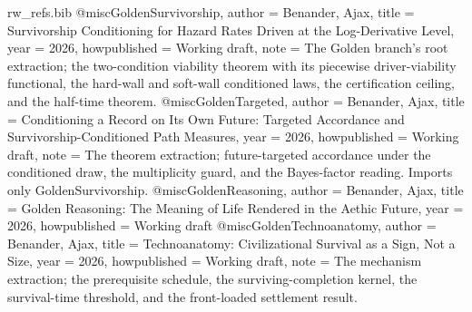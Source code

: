\begin{filecontents}[overwrite]{rw_refs.bib}
@misc{GoldenSurvivorship,
  author       = {Benander, Ajax},
  title        = {Survivorship Conditioning for Hazard Rates Driven at the Log-Derivative Level},
  year         = {2026},
  howpublished = {Working draft},
  note         = {The Golden branch's root extraction; the two-condition viability
                  theorem with its piecewise driver-viability functional, the
                  hard-wall and soft-wall conditioned laws, the certification
                  ceiling, and the half-time theorem.}
}
@misc{GoldenTargeted,
  author       = {Benander, Ajax},
  title        = {Conditioning a Record on Its Own Future: Targeted Accordance and Survivorship-Conditioned Path Measures},
  year         = {2026},
  howpublished = {Working draft},
  note         = {The theorem extraction; future-targeted accordance under the
                  conditioned draw, the multiplicity guard, and the Bayes-factor
                  reading. Imports only GoldenSurvivorship.}
}
@misc{GoldenReasoning,
  author       = {Benander, Ajax},
  title        = {Golden Reasoning: The Meaning of Life Rendered in the Aethic Future},
  year         = {2026},
  howpublished = {Working draft}
}
@misc{GoldenTechnoanatomy,
  author       = {Benander, Ajax},
  title        = {Technoanatomy: Civilizational Survival as a Sign, Not a Size},
  year         = {2026},
  howpublished = {Working draft},
  note         = {The mechanism extraction; the prerequisite schedule, the
                  surviving-completion kernel, the survival-time threshold, and the
                  front-loaded settlement result.}
}


\end{filecontents}
